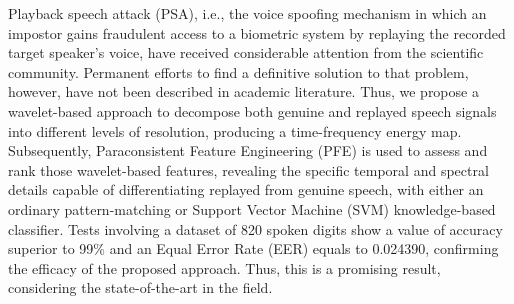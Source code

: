 \par Playback speech attack (PSA), i.e., the voice spoofing mechanism in which an impostor gains fraudulent access to a biometric system by replaying the recorded target speaker's voice, have received considerable attention from the scientific community. Permanent efforts to find a definitive solution to that problem, however, have not been described in academic literature. Thus, we propose a wavelet-based approach to decompose both genuine and replayed speech signals into different levels of resolution, producing a time-frequency energy map. Subsequently, Paraconsistent Feature Engineering (PFE) is used to assess and rank those wavelet-based features, revealing the specific temporal and spectral details capable of differentiating replayed from genuine speech, with either an ordinary pattern-matching or Support Vector Machine (SVM) knowledge-based classifier. Tests involving a dataset of 820 spoken digits show a value of accuracy superior to 99\% and an Equal Error Rate (EER) equals to 0.024390, confirming the efficacy of the proposed approach. Thus, this is a promising result, considering the state-of-the-art in the field.